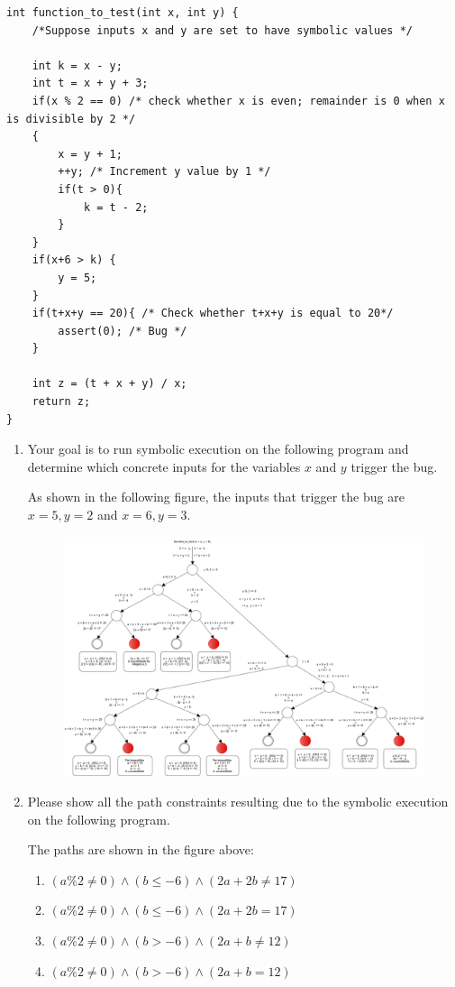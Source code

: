 \documentclass[12pt,a4paper]{article}
\begin{document}
\begin{enumerate}
\begin{lstlisting} 
int function_to_test(int x, int y) {
	/*Suppose inputs x and y are set to have symbolic values */
	
	int k = x - y;
	int t = x + y + 3;
	if(x % 2 == 0) /* check whether x is even; remainder is 0 when x is divisible by 2 */
	{
		x = y + 1;
		++y; /* Increment y value by 1 */
		if(t > 0){
			k = t - 2;
		}
	}	
	if(x+6 > k) {
		y = 5;
	}
	if(t+x+y == 20){ /* Check whether t+x+y is equal to 20*/
		assert(0); /* Bug */
	}
	
	int z = (t + x + y) / x; 
	return z;
}
\end{lstlisting}

\begin{enumerate}
\item Your goal is to run symbolic execution on the following program and determine which concrete inputs for the variables $x$ and $y$ trigger the bug.

\color{blue}

As shown in the following figure, the inputs that trigger the bug are $x=5, y = 2$ and $x = 6, y = 3$.

\begin{figure}[H]
 \centering
 \includegraphics[scale=.30,keepaspectratio=true]{./paths.png}
\end{figure}
\color{black}

\item Please show all the path constraints resulting due to the symbolic execution on the following program.

\color{blue}
The paths are shown in the figure above:

\begin{enumerate}
\item $(a\%2 \neq 0) \wedge (b \leq -6) \wedge (2a + 2b \neq 17)$
\item $(a\%2 \neq 0) \wedge (b \leq -6) \wedge (2a + 2b = 17)$
\item $(a\%2 \neq 0) \wedge (b > -6) \wedge (2a + b \neq 12)$
\item $(a\%2 \neq 0) \wedge (b > -6) \wedge (2a + b = 12)$


\end{enumerate}
\end{enumerate}
\end{enumerate}
\end{document}
